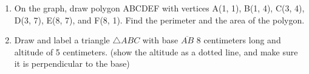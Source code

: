 \begin{enumerate}
\item On the graph, draw polygon ABCDEF with vertices A(1, 1), B(1, 4), C(3, 4), D(3, 7), E(8, 7), and F(8, 1). Find the perimeter and the area of the polygon.
\begin{flushleft}
  \end{flushleft}

\item Draw and label a triangle $\triangle ABC$ with base $\overline{AB}$ 8 centimeters long and altitude of 5 centimeters. (show the altitude as a dotted line, and make sure it is perpendicular to the base) 



\end{enumerate}
